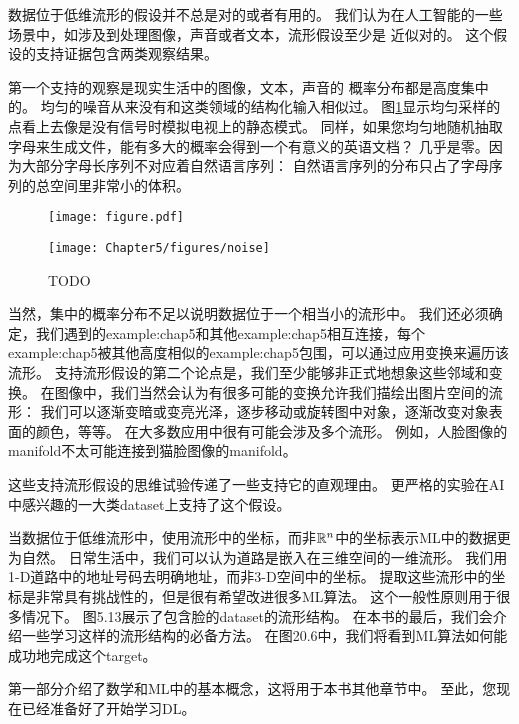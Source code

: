 数据位于低维流形的假设并不总是对的或者有用的。
我们认为在人工智能的一些场景中，如涉及到处理图像，声音或者文本，流形假设至少是
近似对的。
这个假设的支持证据包含两类观察结果。

第一个支持的观察是现实生活中的图像，文本，声音的
概率分布都是高度集中的。
均匀的噪音从来没有和这类领域的结构化输入相似过。
图\ref{fig:chap5_noise}显示均匀采样的点看上去像是没有信号时模拟电视上的静态模式。
同样，如果您均匀地随机抽取字母来生成文件，能有多大的概率会得到一个有意义的英语文档？
几乎是零。因为大部分字母长序列不对应着自然语言序列：
自然语言序列的分布只占了字母序列的总空间里非常小的体积。

\begin{figure}[!htb]
\ifOpenSource
\centerline{\texttt{[image: figure.pdf]}}
\else
\centerline{\texttt{[image: Chapter5/figures/noise]}}
\fi
\caption{TODO}
\label{fig:chap5_noise}
\end{figure}

当然，集中的概率分布不足以说明数据位于一个相当小的流形中。
我们还必须确定，我们遇到的\gls{example:chap5}和其他\gls{example:chap5}相互连接，每个\gls{example:chap5}被其他高度相似的\gls{example:chap5}包围，可以通过应用变换来遍历该流形。
支持流形假设的第二个论点是，我们至少能够非正式地想象这些邻域和变换。
在图像中，我们当然会认为有很多可能的变换允许我们描绘出图片空间的流形：
我们可以逐渐变暗或变亮光泽，逐步移动或旋转图中对象，逐渐改变对象表面的颜色，等等。
在大多数应用中很有可能会涉及多个流形。
例如，人脸图像的\gls{manifold}不太可能连接到猫脸图像的\gls{manifold}。


这些支持流形假设的思维试验传递了一些支持它的直观理由。
更严格的实验\citep{Cayton-2005,Narayanan+Mitter-NIPS2010,Scholkopf98-book,Roweis2000-lle-small,Tenenbaum2000-isomap,Brand2003,Belkin+Niyogi-nips2003,Donoho+Carrie-03,Weinberger04a}在\gls{AI}中感兴趣的一大类\gls{dataset}上支持了这个假设。

当数据位于低维流形中，使用流形中的坐标，而非$\mathbb{R}^n$中的坐标表示\gls{ML}中的数据更为自然。
日常生活中，我们可以认为道路是嵌入在三维空间的一维流形。
我们用1-D道路中的地址号码去明确地址，而非3-D空间中的坐标。
提取这些流形中的坐标是非常具有挑战性的，但是很有希望改进很多\gls{ML}算法。
这个一般性原则用于很多情况下。
图5.13展示了包含脸的\gls{dataset}的流形结构。
在本书的最后，我们会介绍一些学习这样的流形结构的必备方法。
在图20.6中，我们将看到\gls{ML}算法如何能成功地完成这个\gls{target}。

第一部分介绍了数学和\gls{ML}中的基本概念，这将用于本书其他章节中。
至此，您现在已经准备好了开始学习\gls{DL}。




